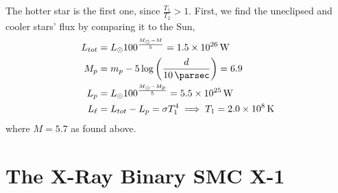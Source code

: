 \documentclass{article}
\begin{document}
\subsection{}

The hotter star is the first one, since \(\frac{T_1}{T_2} > 1\).
First, we find the uneclipsed and cooler stars' flux by comparing it to the Sun,
\begin{align}
    L_{tot} &= L_\odot 100^{\frac{M_\odot - M}{5}} = \SI{1.5e+26}{\watt} \\
    M_p &= m_p - 5 \log\left(\frac{d}{\SI{10}{\parsec}}\right) = \num{6.9} \\
    L_p &= L_\odot 100^{\frac{M_\odot - M_p}{5}} = \SI{5.5e+25}{\watt} \\
    L_\ell &= L_{tot} - L_p = \sigma T_1^4 \implies T_1 = \SI{2.0e+8}{\kelvin}
\end{align}
where \(M = 5.7\) as found above.

\section{The X-Ray Binary SMC X-1}

\subsection{}
\end{document}
